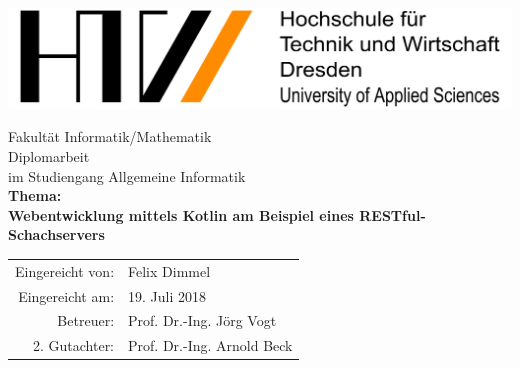 

\begin{titlepage}
	\begin{center}
		\includegraphics[width=1\textwidth]{images/HTW-Logo.png}
	\end{center}
	\Large
	\centering	
	Fakultät Informatik/Mathematik
	\mbox{}\vspace{2\baselineskip}\\
	\huge
	Diplomarbeit
	\vspace{1\baselineskip}\\
	\large
	im Studiengang Allgemeine Informatik
	\vspace{4\baselineskip}\\
	\Large
	\textbf{Thema:}\\
	\textbf{Webentwicklung mittels Kotlin am Beispiel eines RESTful-Schachservers}
	\vspace{4\baselineskip}\\
	\large
	\begin{tabular}{rl}
		Eingereicht von: & Felix Dimmel \\
		Eingereicht am: & 19. Juli 2018 \\
		Betreuer: & Prof. Dr.-Ing. Jörg Vogt \\
		2. Gutachter: & Prof. Dr.-Ing. Arnold Beck
	\end{tabular}
\end{titlepage}

% 
